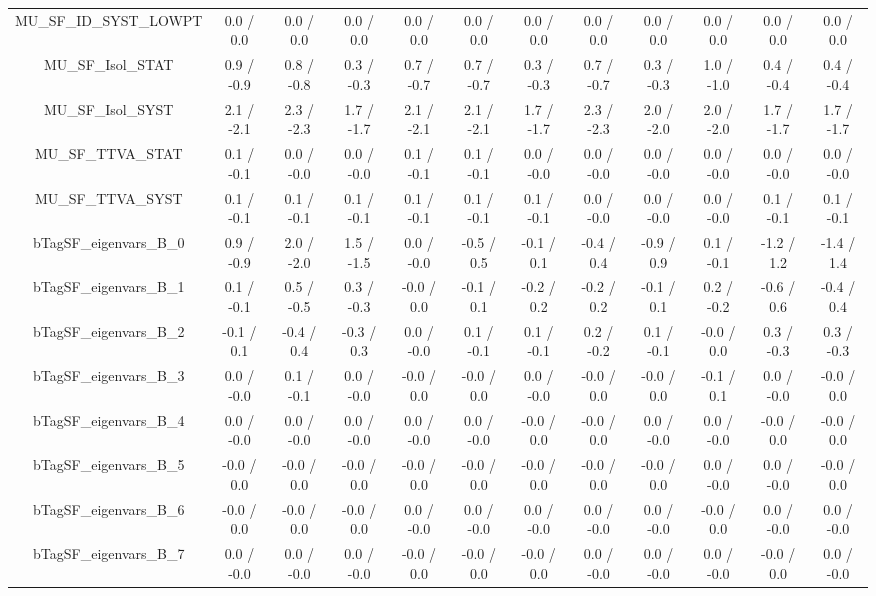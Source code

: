 \begin{table}[htbp]
\begin{center}
\begin{tabular}{|c|c|c|c|c|c|c|c|c|c|c|c|}
  MU_SF_ID_SYST_LOWPT & 0.0 / 0.0 & 0.0 / 0.0 & 0.0 / 0.0 & 0.0 / 0.0 & 0.0 / 0.0 & 0.0 / 0.0 & 0.0 / 0.0 & 0.0 / 0.0 & 0.0 / 0.0 & 0.0 / 0.0 & 0.0 / 0.0 \\ 
  MU_SF_Isol_STAT & 0.9 / -0.9 & 0.8 / -0.8 & 0.3 / -0.3 & 0.7 / -0.7 & 0.7 / -0.7 & 0.3 / -0.3 & 0.7 / -0.7 & 0.3 / -0.3 & 1.0 / -1.0 & 0.4 / -0.4 & 0.4 / -0.4 \\ 
  MU_SF_Isol_SYST & 2.1 / -2.1 & 2.3 / -2.3 & 1.7 / -1.7 & 2.1 / -2.1 & 2.1 / -2.1 & 1.7 / -1.7 & 2.3 / -2.3 & 2.0 / -2.0 & 2.0 / -2.0 & 1.7 / -1.7 & 1.7 / -1.7 \\ 
  MU_SF_TTVA_STAT & 0.1 / -0.1 & 0.0 / -0.0 & 0.0 / -0.0 & 0.1 / -0.1 & 0.1 / -0.1 & 0.0 / -0.0 & 0.0 / -0.0 & 0.0 / -0.0 & 0.0 / -0.0 & 0.0 / -0.0 & 0.0 / -0.0 \\ 
  MU_SF_TTVA_SYST & 0.1 / -0.1 & 0.1 / -0.1 & 0.1 / -0.1 & 0.1 / -0.1 & 0.1 / -0.1 & 0.1 / -0.1 & 0.0 / -0.0 & 0.0 / -0.0 & 0.0 / -0.0 & 0.1 / -0.1 & 0.1 / -0.1 \\ 
  bTagSF_eigenvars_B_0 & 0.9 / -0.9 & 2.0 / -2.0 & 1.5 / -1.5 & 0.0 / -0.0 & -0.5 / 0.5 & -0.1 / 0.1 & -0.4 / 0.4 & -0.9 / 0.9 & 0.1 / -0.1 & -1.2 / 1.2 & -1.4 / 1.4 \\ 
  bTagSF_eigenvars_B_1 & 0.1 / -0.1 & 0.5 / -0.5 & 0.3 / -0.3 & -0.0 / 0.0 & -0.1 / 0.1 & -0.2 / 0.2 & -0.2 / 0.2 & -0.1 / 0.1 & 0.2 / -0.2 & -0.6 / 0.6 & -0.4 / 0.4 \\ 
  bTagSF_eigenvars_B_2 & -0.1 / 0.1 & -0.4 / 0.4 & -0.3 / 0.3 & 0.0 / -0.0 & 0.1 / -0.1 & 0.1 / -0.1 & 0.2 / -0.2 & 0.1 / -0.1 & -0.0 / 0.0 & 0.3 / -0.3 & 0.3 / -0.3 \\ 
  bTagSF_eigenvars_B_3 & 0.0 / -0.0 & 0.1 / -0.1 & 0.0 / -0.0 & -0.0 / 0.0 & -0.0 / 0.0 & 0.0 / -0.0 & -0.0 / 0.0 & -0.0 / 0.0 & -0.1 / 0.1 & 0.0 / -0.0 & -0.0 / 0.0 \\ 
  bTagSF_eigenvars_B_4 & 0.0 / -0.0 & 0.0 / -0.0 & 0.0 / -0.0 & 0.0 / -0.0 & 0.0 / -0.0 & -0.0 / 0.0 & -0.0 / 0.0 & 0.0 / -0.0 & 0.0 / -0.0 & -0.0 / 0.0 & -0.0 / 0.0 \\ 
  bTagSF_eigenvars_B_5 & -0.0 / 0.0 & -0.0 / 0.0 & -0.0 / 0.0 & -0.0 / 0.0 & -0.0 / 0.0 & -0.0 / 0.0 & -0.0 / 0.0 & -0.0 / 0.0 & 0.0 / -0.0 & 0.0 / -0.0 & -0.0 / 0.0 \\ 
  bTagSF_eigenvars_B_6 & -0.0 / 0.0 & -0.0 / 0.0 & -0.0 / 0.0 & 0.0 / -0.0 & 0.0 / -0.0 & 0.0 / -0.0 & 0.0 / -0.0 & 0.0 / -0.0 & -0.0 / 0.0 & 0.0 / -0.0 & 0.0 / -0.0 \\ 
  bTagSF_eigenvars_B_7 & 0.0 / -0.0 & 0.0 / -0.0 & 0.0 / -0.0 & -0.0 / 0.0 & -0.0 / 0.0 & -0.0 / 0.0 & 0.0 / -0.0 & 0.0 / -0.0 & 0.0 / -0.0 & -0.0 / 0.0 & 0.0 / -0.0 \\ 

\end{tabular}
\end{center}
\end{table}

